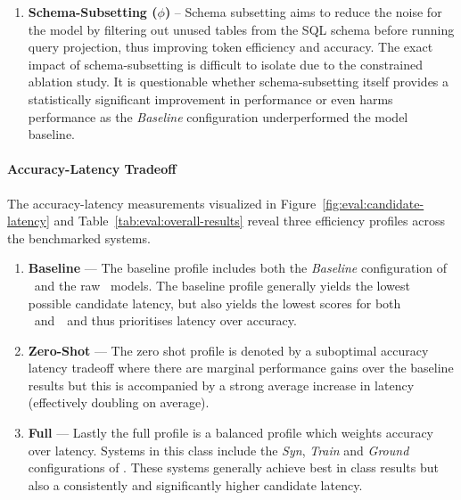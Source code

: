 \begin{enumerate}
        self-refinement is unable to correct significant semantic errors on its
        own without ICL.
    \item \textbf{Schema-Subsetting ($\phi$)} – Schema subsetting aims to
        reduce the noise for the model by filtering out unused tables from the
        SQL schema before running query projection, thus improving token
        efficiency and accuracy. The exact impact of schema-subsetting is
        difficult to isolate due to the constrained ablation study. It is
        questionable whether schema-subsetting itself provides a statistically
        significant improvement in performance or even harms performance as the
        \textit{Baseline} configuration underperformed the model baseline.
\end{enumerate}

\paragraph{Accuracy-Latency Tradeoff}

The accuracy-latency measurements visualized in
Figure~\ref{fig:eval:candidate-latency} and
Table~\ref{tab:eval:overall-results} reveal three efficiency profiles
across the benchmarked systems.

\begin{enumerate}
    \item \textbf{Baseline} — The baseline profile includes both the
        \textit{Baseline} configuration of \Natural~and the raw \OmniSQL~models.
        The baseline profile generally yields the lowest possible candidate
        latency, but also yields the lowest scores for both \EA~and~\EM~and
        thus prioritises latency over accuracy.
    \item \textbf{Zero-Shot} — The zero shot profile is denoted by a suboptimal
        accuracy latency tradeoff where there are marginal performance gains
        over the baseline results but this is accompanied by a strong average
        increase in latency (effectively doubling on average).
    \item \textbf{Full} — Lastly the full profile is a balanced profile which
        weights accuracy over latency. Systems in this class include the
        \textit{Syn}, \textit{Train} and \textit{Ground} configurations of
        \Natural. These systems generally achieve best in class results but
        also a consistently and significantly higher candidate latency.
\end{enumerate}

